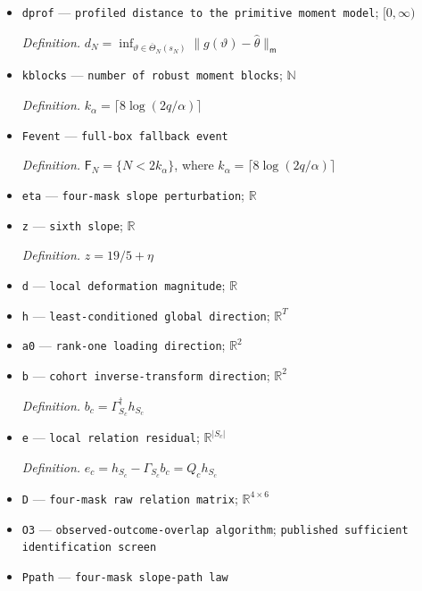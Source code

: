 \documentclass{article}
\begin{document}
\begin{itemize}
  \par\smallskip\noindent\emph{Definition.} \(\overline\Theta_N(s_N)\)
  \item \texttt{dprof} --- \texttt{profiled distance to the primitive moment model}; \([0,\infty)\)
  \par\smallskip\noindent\emph{Definition.} \(d_N=\inf_{\vartheta\in\overline\Theta_N(s_N)}\|g(\vartheta)-\widehat\theta\|_{\mathsf m}\)
  \item \texttt{kblocks} --- \texttt{number of robust moment blocks}; \(\mathbb N\)
  \par\smallskip\noindent\emph{Definition.} \(k_\alpha=\lceil8\log(2q/\alpha)\rceil\)
  \item \texttt{Fevent} --- \texttt{full-\allowbreak{}box fallback event}
  \par\smallskip\noindent\emph{Definition.} \(\mathsf F_N=\{N<2k_\alpha\}\), where \(k_\alpha=\lceil8\log(2q/\alpha)\rceil\)
  \item \texttt{eta} --- \texttt{four-\allowbreak{}mask slope perturbation}; \(\mathbb R\)
  \item \texttt{z} --- \texttt{sixth slope}; \(\mathbb R\)
  \par\smallskip\noindent\emph{Definition.} \(z=19/5+\eta\)
  \item \texttt{d} --- \texttt{local deformation magnitude}; \(\mathbb R\)
  \item \texttt{h} --- \texttt{least-\allowbreak{}conditioned global direction}; \(\mathbb R^T\)
  \item \texttt{a0} --- \texttt{rank-\allowbreak{}one loading direction}; \(\mathbb R^2\)
  \item \texttt{b} --- \texttt{cohort inverse-\allowbreak{}transform direction}; \(\mathbb R^2\)
  \par\smallskip\noindent\emph{Definition.} \(b_c=\Gamma_{S_c}^{\dagger}h_{S_c}\)
  \item \texttt{e} --- \texttt{local relation residual}; \(\mathbb R^{|S_c|}\)
  \par\smallskip\noindent\emph{Definition.} \(e_c=h_{S_c}-\Gamma_{S_c}b_c=Q_ch_{S_c}\)
  \item \texttt{D} --- \texttt{four-\allowbreak{}mask raw relation matrix}; \(\mathbb R^{4\times 6}\)
  \item \texttt{O3} --- \texttt{observed-\allowbreak{}outcome-\allowbreak{}overlap algorithm}; \texttt{published sufficient identification screen}
  \item \texttt{Ppath} --- \texttt{four-\allowbreak{}mask slope-\allowbreak{}path law}

\end{itemize}
\end{document}
